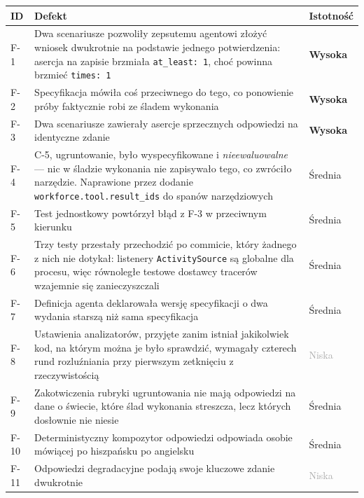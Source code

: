 \documentclass[11pt,a4paper]{article}
\begin{document}
\begin{table}[htbp]
\centering
\small
\begin{tabularx}{\textwidth}{@{}p{1.0cm}Xp{1.6cm}@{}}
\toprule
\textbf{ID} & \textbf{Defekt} & \textbf{Istotność} \\
\midrule
F-1 & Dwa scenariusze pozwoliły zepsutemu agentowi złożyć wniosek dwukrotnie na podstawie jednego potwierdzenia: asercja na zapisie brzmiała \texttt{at\_least: 1}, choć powinna brzmieć \texttt{times: 1} & \textcolor{accentred}{\textbf{Wysoka}} \\
F-2 & Specyfikacja mówiła coś przeciwnego do tego, co ponowienie próby faktycznie robi ze śladem wykonania & \textcolor{accentred}{\textbf{Wysoka}} \\
F-3 & Dwa scenariusze zawierały asercje sprzecznych odpowiedzi na identyczne zdanie & \textcolor{accentred}{\textbf{Wysoka}} \\
F-4 & C-5, ugruntowanie, było wyspecyfikowane i \emph{nieewaluowalne} --- nic w śladzie wykonania nie zapisywało tego, co zwróciło narzędzie. Naprawione przez dodanie \texttt{workforce.tool.result\_ids} do spanów narzędziowych & \textcolor{accentorange}{Średnia} \\
F-5 & Test jednostkowy powtórzył błąd z F-3 w przeciwnym kierunku & \textcolor{accentorange}{Średnia} \\
F-6 & Trzy testy przestały przechodzić po commicie, który żadnego z nich nie dotykał: listenery \texttt{ActivitySource} są globalne dla procesu, więc równoległe testowe dostawcy tracerów wzajemnie się zanieczyszczali & \textcolor{accentorange}{Średnia} \\
F-7 & Definicja agenta deklarowała wersję specyfikacji o dwa wydania starszą niż sama specyfikacja & \textcolor{accentorange}{Średnia} \\
F-8 & Ustawienia analizatorów, przyjęte zanim istniał jakikolwiek kod, na którym można je było sprawdzić, wymagały czterech rund rozluźniania przy pierwszym zetknięciu z rzeczywistością & \textcolor{darkgray}{Niska} \\
F-9 & Zakotwiczenia rubryki ugruntowania nie mają odpowiedzi na dane o świecie, które ślad wykonania streszcza, lecz których dosłownie nie niesie & \textcolor{accentorange}{Średnia} \\
F-10 & Deterministyczny kompozytor odpowiedzi odpowiada osobie mówiącej po hiszpańsku po angielsku & \textcolor{accentorange}{Średnia} \\
F-11 & Odpowiedzi degradacyjne podają swoje kluczowe zdanie dwukrotnie & \textcolor{darkgray}{Niska} \\

\end{tabularx}
\end{table}
\end{document}
